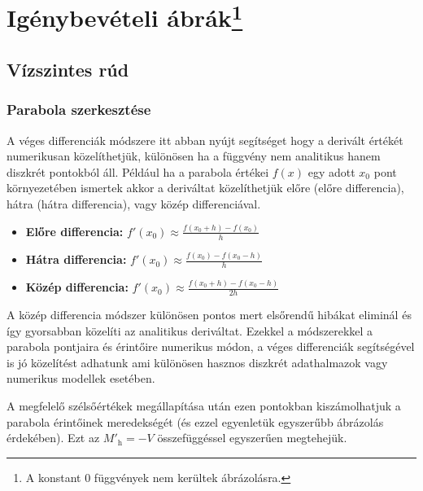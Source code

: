 \section[\texorpdfstring{Igénybevételi ábrák}{Igénybevételi ábrák}]%
{Igénybevételi ábrák\protect\footnote{A konstant 0 függvények nem kerültek ábrázolásra.}}

\pgfmathsetmacro{\framewidth}{.7mm}

\subsection{Vízszintes rúd}

\subsubsection{Parabola szerkesztése}


A véges differenciák módszere itt abban nyújt segítséget hogy a derivált értékét numerikusan közelíthetjük, különösen ha a függvény nem analitikus hanem diszkrét pontokból áll. Például ha a parabola értékei $f(x)$ egy adott $x_0$ pont környezetében ismertek akkor a deriváltat közelíthetjük előre (előre differencia), hátra (hátra differencia), vagy közép differenciával.

\vskip 20pt

\begin{itemize}
	\item \textbf{Előre differencia:}
		$f'(x_0) \approx \frac{f(x_0 + h) - f(x_0)}{h}$

	\item \textbf{Hátra differencia:}
		$f'(x_0) \approx \frac{f(x_0) - f(x_0 - h)}{h}$

	\item \textbf{Közép differencia:}
		$f'(x_0) \approx \frac{f(x_0 + h) - f(x_0 - h)}{2h}$
\end{itemize}

\vskip 20pt

A közép differencia módszer különösen pontos mert elsőrendű hibákat eliminál és így gyorsabban közelíti az analitikus deriváltat. Ezekkel a módszerekkel a parabola pontjaira és érintőire numerikus módon, a véges differenciák segítségével is jó közelítést adhatunk ami különösen hasznos diszkrét adathalmazok vagy numerikus modellek esetében.

A megfelelő szélsőértékek megállapítása után ezen pontokban kiszámolhatjuk a parabola érintőinek meredekségét (és ezzel egyenletük egyszerűbb ábrázolás érdekében). Ezt az ${M'}_\text{h} = -V$ összefüggéssel egyszerűen megtehejük.

